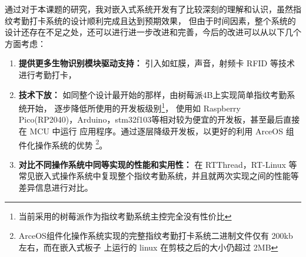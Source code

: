     通过对于本课题的研究，我对嵌入式系统开发有了比较深刻的理解和认识，虽然指纹考勤打卡系统的设计顺利完成且达到预期效果，
    但由于时间因素，整个系统的设计还存在不足之处，还可以进行进一步改进和完善，今后的改进可以从以下几个方面考虑：

    \begin{enumerate}
        \item \textbf{提供更多生物识别模块驱动支持：} 引入如虹膜，声音，射频卡 RFID 等技术进行考勤打卡，
        \item \textbf{技术下放：} 如同整个设计最开始的那样，由树莓派4B上实现简单指纹考勤系统开始，
        逐步降低所使用的开发板级别\footnote{当前采用的树莓派作为指纹考勤系统主控完全没有性价比}，
        使用如 Raspberry Pico(RP2040)，Arduino，stm32f103等相对较为便宜的开发板，甚至最后直接在 MCU 中运行
        应用程序。通过逐层降级开发板，以更好的利用 ArceOS 组件化操作系统的优势
        \footnote{ArceOS组件化操作系统实现的完整指纹考勤打卡系统二进制文件仅有 200kb 左右，而在嵌入式板子
        上运行的 linux 在剪枝之后的大小仍超过 2MB}。
        \item \textbf{对比不同操作系统中同等实现的性能和实用性：}
        在 RTThread，RT-Linux 等常见嵌入式操作系统中复现整个指纹考勤系统，并且就两次实现之间的性能等差异信息进行对比。
        
    \end{enumerate}